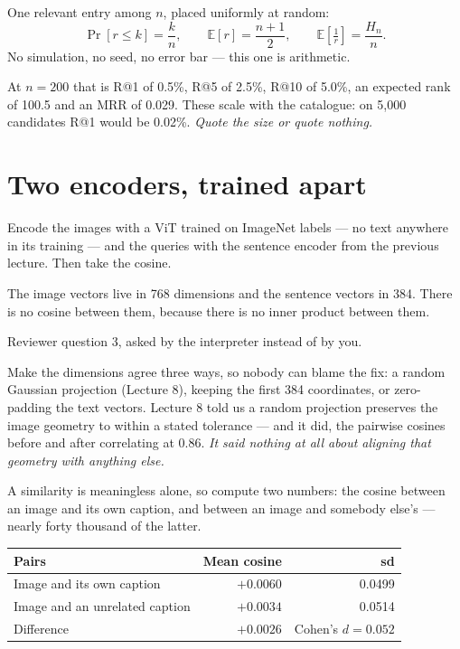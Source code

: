\documentclass[11pt,a4paper]{article}
\begin{document}
\begin{derivbox}[title={The trivial baseline, computed rather than run}]
One relevant entry among $n$, placed uniformly at random:
\[ \Pr[r \le k] = \frac{k}{n}, \qquad
   \mathbb{E}[r] = \frac{n+1}{2}, \qquad
   \mathbb{E}\!\left[\tfrac{1}{r}\right] = \frac{H_n}{n}. \]
No simulation, no seed, no error bar --- this one is arithmetic.
\end{derivbox}

At $n = 200$ that is R@1 of 0.5\%, R@5 of 2.5\%, R@10 of 5.0\%, an expected
rank of 100.5 and an MRR of 0.029. These scale with the catalogue: on 5{,}000
candidates R@1 would be 0.02\%. \emph{Quote the size or quote nothing.}

\section{Two encoders, trained apart}

Encode the images with a ViT trained on ImageNet labels --- no text anywhere in
its training --- and the queries with the sentence encoder from the previous
lecture. Then take the cosine.

\begin{failbox}[title={Failure condition --- it does not even typecheck}]
The image vectors live in 768 dimensions and the sentence vectors in 384.
There is no cosine between them, because there is no inner product between
them.

Reviewer question 3, asked by the interpreter instead of by you.
\end{failbox}

Make the dimensions agree three ways, so nobody can blame the fix: a random
Gaussian projection (Lecture 8), keeping the first 384 coordinates, or
zero-padding the text vectors. Lecture 8 told us a random projection preserves
the image geometry to within a stated tolerance --- and it did, the pairwise
cosines before and after correlating at 0.86. \emph{It said nothing at all
about aligning that geometry with anything else.}

A similarity is meaningless alone, so compute two numbers: the cosine between
an image and its own caption, and between an image and somebody else's ---
nearly forty thousand of the latter.

\begin{center}
\small
\begin{tabular}{lrr}
\toprule
\textbf{Pairs} & \textbf{Mean cosine} & \textbf{sd} \\
\midrule
Image and its own caption & $+0.0060$ & 0.0499 \\
Image and an unrelated caption & $+0.0034$ & 0.0514 \\
\midrule
Difference & $+0.0026$ & Cohen's $d = 0.052$ \\
\bottomrule
\end{tabular}
\end{center}
\end{document}
